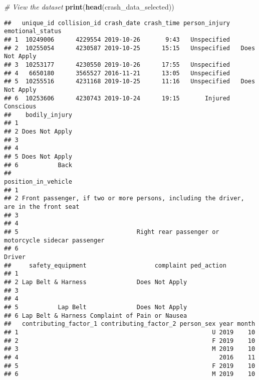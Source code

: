 \documentclass[
]{article}
\newenvironment{Shaded}{\begin{snugshade}}{\end{snugshade}}
\newcommand{\CommentTok}[1]{\textcolor[rgb]{0.56,0.35,0.01}{\textit{#1}}}
\newcommand{\FunctionTok}[1]{\textcolor[rgb]{0.13,0.29,0.53}{\textbf{#1}}}
\newcommand{\NormalTok}[1]{#1}
\begin{document}
\begin{Shaded}
\begin{Highlighting}[]
\CommentTok{\# View the dataset}
\FunctionTok{print}\NormalTok{(}\FunctionTok{head}\NormalTok{(crash\_data\_selected))}
\end{Highlighting}
\end{Shaded}

\begin{verbatim}
##   unique_id collision_id crash_date crash_time person_injury emotional_status
## 1  10249006      4229554 2019-10-26       9:43   Unspecified                 
## 2  10255054      4230587 2019-10-25      15:15   Unspecified   Does Not Apply
## 3  10253177      4230550 2019-10-26      17:55   Unspecified                 
## 4   6650180      3565527 2016-11-21      13:05   Unspecified                 
## 5  10255516      4231168 2019-10-25      11:16   Unspecified   Does Not Apply
## 6  10253606      4230743 2019-10-24      19:15       Injured        Conscious
##    bodily_injury
## 1               
## 2 Does Not Apply
## 3               
## 4               
## 5 Does Not Apply
## 6           Back
##                                                                    position_in_vehicle
## 1                                                                                     
## 2 Front passenger, if two or more persons, including the driver, are in the front seat
## 3                                                                                     
## 4                                                                                     
## 5                                 Right rear passenger or motorcycle sidecar passenger
## 6                                                                               Driver
##     safety_equipment                   complaint ped_action
## 1                                                          
## 2 Lap Belt & Harness              Does Not Apply           
## 3                                                          
## 4                                                          
## 5           Lap Belt              Does Not Apply           
## 6 Lap Belt & Harness Complaint of Pain or Nausea           
##   contributing_factor_1 contributing_factor_2 person_sex year month
## 1                                                      U 2019    10
## 2                                                      F 2019    10
## 3                                                      M 2019    10
## 4                                                        2016    11
## 5                                                      F 2019    10
## 6                                                      M 2019    10
\end{verbatim}
\end{document}
